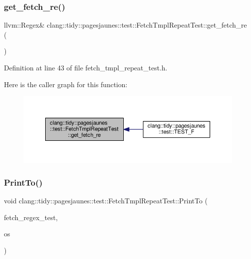 \subsubsection{\texorpdfstring{get\+\_\+fetch\+\_\+re()}{get\_fetch\_re()}}
{\footnotesize\ttfamily llvm\+::\+Regex\& clang\+::tidy\+::pagesjaunes\+::test\+::\+Fetch\+Tmpl\+Repeat\+Test\+::get\+\_\+fetch\+\_\+re (\begin{DoxyParamCaption}{ }\end{DoxyParamCaption})\hspace{0.3cm}{\ttfamily [inline]}}



Definition at line 43 of file fetch\+\_\+tmpl\+\_\+repeat\+\_\+test.\+h.

Here is the caller graph for this function\+:
\nopagebreak
\begin{figure}[H]
\begin{center}
\leavevmode
\includegraphics[width=350pt]{classclang_1_1tidy_1_1pagesjaunes_1_1test_1_1_fetch_tmpl_repeat_test_a7e71f48020a2dfe5179f289ade5ce00b_icgraph}
\end{center}
\end{figure}
\mbox{\label{classclang_1_1tidy_1_1pagesjaunes_1_1test_1_1_fetch_tmpl_repeat_test_a68c8f2164da8d6e48f1138ce9f9a18ec}} 
\subsubsection{\texorpdfstring{Print\+To()}{PrintTo()}}
{\footnotesize\ttfamily void clang\+::tidy\+::pagesjaunes\+::test\+::\+Fetch\+Tmpl\+Repeat\+Test\+::\+Print\+To (\begin{DoxyParamCaption}\item[{const \hyperlink{classclang_1_1tidy_1_1pagesjaunes_1_1test_1_1_fetch_tmpl_repeat_test}{Fetch\+Tmpl\+Repeat\+Test} \&}]{fetch\+\_\+regex\+\_\+test,  }\item[{\+::std\+::ostream $\ast$}]{os }\end{DoxyParamCaption})}



